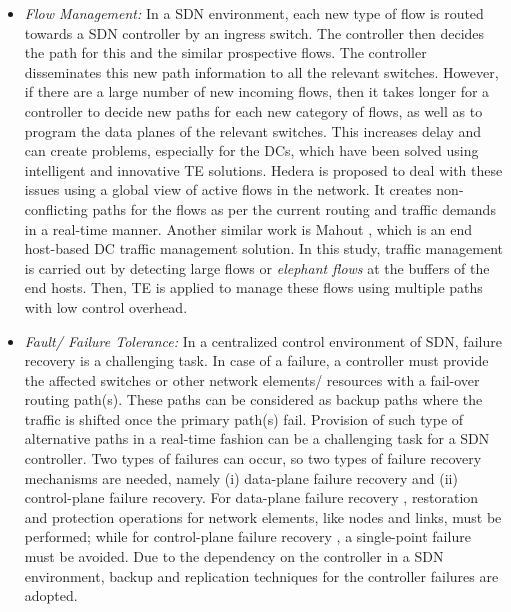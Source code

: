 \documentclass[10pt]{IEEEtran}
\begin{document}
\begin{itemize}

\vspace{1mm}
\item{\textit{Flow Management:}} In a SDN environment, each new type of flow is routed towards a SDN controller by an ingress switch. The controller then decides the path for this and the similar prospective flows. The controller disseminates this new path information to all the relevant switches. However, if there are a large number of new incoming flows, then it takes longer for a controller to decide new paths for each new category of flows, as well as to program the data planes of the relevant switches. This increases delay and can create problems, especially for the DCs, which have been solved using intelligent and innovative TE solutions. Hedera \cite{al2010hedera} is proposed to deal with these issues using a global view of active flows in the network. It creates non-conflicting paths for the flows as per the current routing and traffic demands in a real-time manner. Another similar work is Mahout \cite{curtis2011mahout}, which is an end host-based DC traffic management solution. In this study, traffic management is carried out by detecting large flows or \textit{elephant flows} at the buffers of the end hosts. Then, TE is applied to manage these flows using multiple paths with low control overhead.

\vspace{1mm}
\item{\textit{Fault/ Failure Tolerance:}} In a centralized control environment of SDN, failure recovery is a challenging task. In case of a failure, a controller must provide the affected switches or other network elements/ resources with a fail-over routing path(s). These paths can be considered as backup paths where the traffic is shifted once the primary path(s) fail. Provision of such type of alternative paths in a real-time fashion can be a challenging task for a SDN controller. Two types of failures can occur, so two types of failure recovery mechanisms are needed, namely (i) data-plane failure recovery and (ii) control-plane failure recovery. For data-plane failure recovery \cite{sharma2011enabling}, restoration and protection operations for network elements, like nodes and links, must be performed; while for control-plane failure recovery \cite{fonseca2012replication}, a single-point failure must be avoided. Due to the dependency on the controller in a SDN environment, backup and replication techniques for the controller failures are adopted.




\end{itemize}
\end{document}
